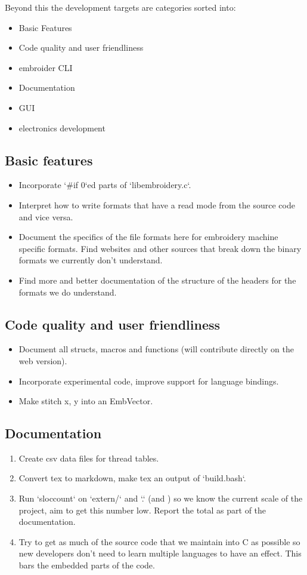 Beyond this the development targets are categories sorted into:

\begin{itemize}
\item Basic Features
\item Code quality and user friendliness
\item embroider CLI
\item Documentation
\item GUI
\item electronics development
\end{itemize}

\subsection{Basic features}

\begin{itemize}
\item Incorporate `\#if 0`ed parts of `libembroidery.c`.
\item Interpret how to write formats that have a read mode from the source code and vice versa.
\item Document the specifics of the file formats here for embroidery machine specific formats. Find websites and other sources that break down the binary formats we currently don't understand.
\item Find more and better documentation of the structure of the headers for the formats we do understand.
\end{itemize}

\subsection{Code quality and user friendliness}

\begin{itemize}
\item Document all structs, macros and functions (will contribute directly
   on the web version).
\item Incorporate experimental code, improve support for language bindings.
\item Make stitch x, y into an EmbVector.
\end{itemize}

\subsection{Documentation}

\begin{enumerate}
\item Create csv data files for thread tables.
\item Convert tex to markdown, make tex an output of `build.bash`.
\item Run `sloccount` on `extern/` and `.` (and ) so we know the current scale of the project, aim to get this number low. Report the total as part of the documentation.
\item Try to get as much of the source code that we maintain into C as possible so new developers don't need to learn multiple languages to have an effect. This bars the embedded parts of the code. 
\end{enumerate}


